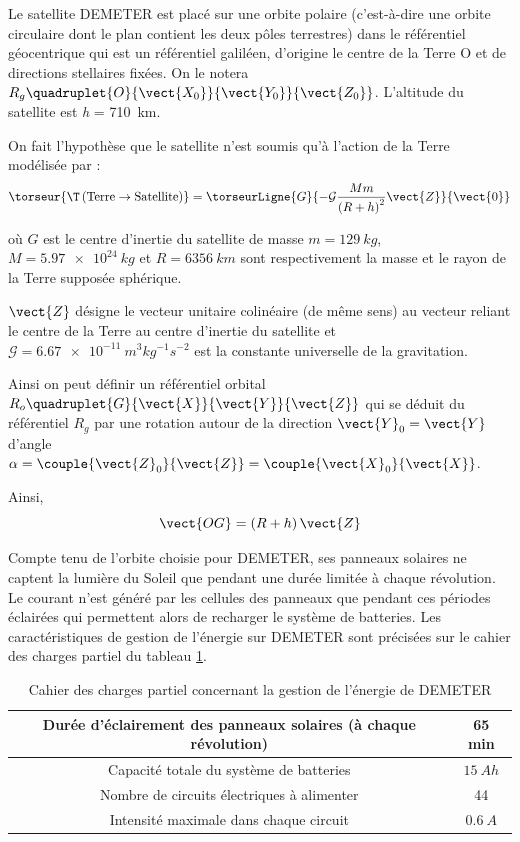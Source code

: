 Le satellite DEMETER est placé sur une orbite polaire (c'est-à-dire une
orbite circulaire dont le plan contient les deux pôles terrestres) dans
le référentiel géocentrique qui est un référentiel galiléen, d'origine
le centre de la Terre O et de directions stellaires fixées. On le notera $R_g\quadruplet{O}{\vect{X_0}}{\vect{Y_0}}{\vect{Z_0}}$. L'altitude du satellite
est \emph{h} = \SI{710}{km}.

On fait l'hypothèse que le satellite n'est soumis qu'à l'action de la Terre modélisée par :
$$
\torseur{\T\left(\text{Terre}\to \text{Satellite}\right)}=\torseurLigne{G}{-\mathcal{G}\dfrac{Mm}{\left(R+h\right)^2}\vect{Z}}{\vect{0}}
$$


où $G$ est le centre d'inertie du satellite de masse $m = \SI{129}{kg}$, 
$M = \SI{5,97e24}{kg}$ 
et $R = \SI{6356}{km}$
sont respectivement la masse et le rayon de la Terre supposée sphérique.

$\vect{Z}$ désigne le vecteur unitaire colinéaire (de même sens) au vecteur reliant
le centre de la Terre au centre d'inertie du satellite et $\mathcal{G} =\SI{6,67e-11}{m^{3}  kg^{-1} s^{-2}}$ est la
constante universelle de la gravitation.

Ainsi on peut définir un référentiel orbital $R_o\quadruplet{G}{\vect{X}}{\vect{Y}}{\vect{Z}}$ qui se déduit du référentiel $R_g$ par une rotation autour de la direction $\vect{Y}_0=\vect{Y}$ d'angle $\alpha=\couple{\vect{Z}_0}{\vect{Z}}=\couple{\vect{X}_0}{\vect{X}}$.


 Ainsi,$$
\vect{OG}=\left(R+h\right)\vect{Z}
$$

Compte tenu de l'orbite choisie pour DEMETER, ses panneaux solaires ne
captent la lumière du Soleil que pendant une durée limitée à chaque
révolution. Le courant n'est généré par les cellules des panneaux que
pendant ces périodes éclairées qui permettent alors de recharger le
système de batteries. Les caractéristiques de gestion de l'énergie sur
DEMETER sont précisées sur le cahier des charges partiel du tableau \ref{tab3}.


\begin{table}[!htb]
\begin{center}
\begin{tabular}{|c|c|}
\hline
Durée d'éclairement des panneaux solaires (à chaque révolution) & 65 min\\ \hline
Capacité totale du système de batteries & $\SI{15}{A h}$\\ \hline
Nombre de circuits électriques à alimenter & 44\\ \hline
Intensité maximale dans chaque circuit & $\SI{0,6}{A}$\\ \hline
\end{tabular}
\caption{Cahier des charges partiel concernant la gestion de
l'énergie de DEMETER \label{tab3}}
\end{center}
\end{table}

